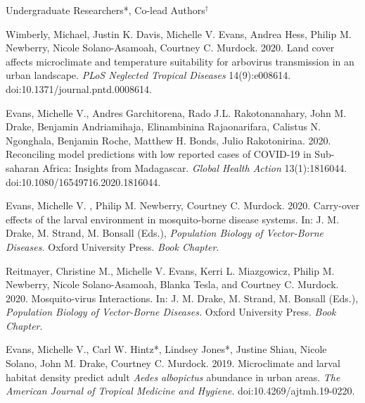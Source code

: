 


\bigskip
Undergraduate Researchers*, Co-lead Authors$^\dagger$

\smallskip

\begin{etaremune}

\item Wimberly, Michael, Justin K. Davis, \textcolor{awesome}{Michelle V. Evans}, Andrea Hess, Philip M. Newberry, Nicole Solano-Asamoah, Courtney C. Murdock. 2020. Land cover affects microclimate and temperature suitability for arbovirus transmission in an urban landscape. \textit{PLoS Neglected Tropical Diseases} 14(9):e008614. doi:10.1371/journal.pntd.0008614. \smallskip

\item \textcolor{awesome}{Evans, Michelle V.}, Andres Garchitorena, Rado J.L. Rakotonanahary, John M. Drake, Benjamin Andriamihaja, Elinambinina Rajaonarifara, Calistus N. Ngonghala, Benjamin Roche, Matthew H. Bonds, Julio Rakotonirina. 2020. Reconciling model predictions with low reported cases of COVID-19 in Sub-saharan Africa: Insights from Madagascar. \textit{Global Health Action} 13(1):1816044. doi:10.1080/16549716.2020.1816044. \smallskip

\item \textcolor{awesome}{Evans, Michelle V. }, Philip M. Newberry, Courtney C. Murdock. 2020. Carry-over effects of the larval environment in mosquito-borne disease systems. In: J. M. Drake, M. Strand, M. Bonsall (Eds.), \textit{Population Biology of Vector-Borne Diseases.} Oxford University Press. \textit{Book Chapter}.\smallskip

\item Reitmayer, Christine M., \textcolor{awesome}{Michelle V. Evans}, Kerri L. Miazgowicz, Philip M. Newberry, Nicole Solano-Asamoah, Blanka Tesla, and Courtney C. Murdock. 2020. Mosquito-virus Interactions. In: J. M. Drake, M. Strand, M. Bonsall (Eds.), \textit{Population Biology of Vector-Borne Diseases.} Oxford University Press. \textit{Book Chapter}. \smallskip

\item \textcolor{awesome}{Evans, Michelle V.}, Carl W. Hintz*, Lindsey Jones*, Justine Shiau, Nicole Solano, John M. Drake, Courtney C. Murdock. 2019. Microclimate and larval habitat density predict adult \textit{Aedes albopictus} abundance in urban areas. \textit{The American Journal of Tropical Medicine and Hygiene}. doi:10.4269/ajtmh.19-0220. \smallskip


\end{etaremune}
